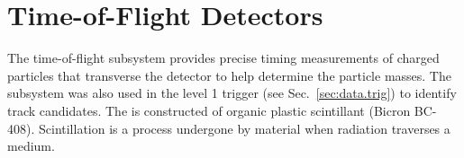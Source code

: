 \FloatBarrier
\section{Time-of-Flight Detectors}\label{sec:clas.tof}

The  time-of-flight  subsystem provides precise timing measurements of charged particles that transverse the  detector to help determine the particle masses. The  subsystem was also used in the  level 1 trigger (see Sec.~\ref{sec:data.trig}) to identify track candidates. The  is constructed of organic plastic scintillant (Bicron BC-408). Scintillation is a process undergone by material when radiation traverses a medium.
%
%

